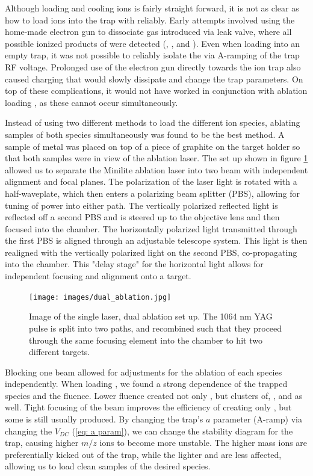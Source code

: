 Although loading and cooling  ions is fairly straight forward, it is not as clear as how to load  ions into the trap with  reliably. Early attempts involved using the home-made electron gun to dissociate  gas introduced via leak valve, where all possible ionized products of  were detected (, , and ). Even when loading into an empty trap, it was not possible to reliably isolate the  via A-ramping of the trap RF voltage. Prolonged use of the electron gun directly towards the ion trap also caused charging that would slowly dissipate and change the trap parameters. On top of these complications, it would not have worked in conjunction with ablation loading , as these cannot occur simultaneously.

Instead of using two different methods to load the different ion species, ablating samples of both species simultaneously was found to be the best method. A sample of  metal was placed on top of a piece of graphite on the target holder so that both samples were in view of the ablation laser. The set up shown in figure \ref{fig: dual ablation} allowed us to separate the Minilite ablation laser into two beam with independent alignment and focal planes. The polarization of the laser light is rotated with a half-waveplate, which then enters a polarizing beam splitter (PBS), allowing for tuning of power into either path. The vertically polarized reflected light is reflected off a second PBS and is steered up to the objective lens and then focused into the chamber. The horizontally polarized light transmitted through the first PBS is aligned through an adjustable telescope system. This light is then realigned with the vertically polarized light on the second PBS, co-propagating into the chamber. This "delay stage" for the horizontal light allows for independent focusing and alignment onto a target.

\begin{figure}[H]
	\centering
	\texttt{[image: images/dual\_ablation.jpg]}
	\caption{Image of the single laser, dual ablation set up. The 1064 nm YAG pulse is split into two paths, and recombined such that they proceed through the same focusing element into the chamber to hit two different targets.}
	\label{fig: dual ablation}
\end{figure}

Blocking one beam allowed for adjustments for the ablation of each species independently. When loading , we found a strong dependence of the trapped species and the fluence. Lower fluence created not only , but clusters of, , and  as well. Tight focusing of the beam improves the efficiency of creating only , but some  is still usually produced. By changing the trap's $a$ parameter (A-ramp) via changing the $V_{DC}$ (\ref{eq: a param}), we can change the stability diagram for the trap, causing higher $m/z$ ions to become more unstable. The higher mass  ions are preferentially kicked out of the trap, while the lighter  and  are less affected, allowing us to load clean samples of the desired species.

